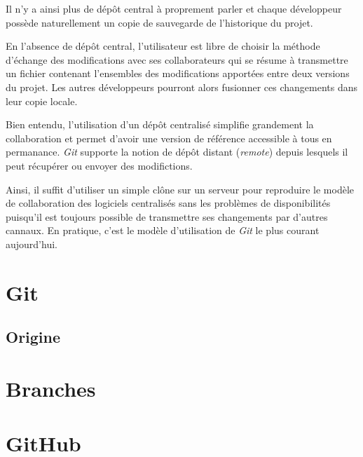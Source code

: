 \documentclass[11pt,a4paper]{article}
\begin{document}
Il n'y a ainsi plus de dépôt central à proprement parler et chaque développeur possède naturellement un copie de sauvegarde de l'historique du projet.

En l'absence de dépôt central, l'utilisateur est libre de choisir la méthode d'échange des modifications avec ses collaborateurs qui se résume à transmettre un fichier contenant l'ensembles des modifications apportées entre deux versions du projet. Les autres développeurs pourront alors fusionner ces changements dans leur copie locale.

Bien entendu, l'utilisation d'un dépôt centralisé simplifie grandement la collaboration et permet d'avoir une version de référence accessible à tous en permanance. \textit{Git} supporte la notion de dépôt distant (\textit{remote}) depuis lesquels il peut récupérer ou envoyer des modifictions.

Ainsi, il suffit d'utiliser un simple clône sur un serveur pour reproduire le modèle de collaboration des logiciels centralisés sans les problèmes de disponibilités puisqu'il est toujours possible de transmettre ses changements par d'autres cannaux. En pratique, c'est le modèle d'utilisation de \textit{Git} le plus courant aujourd'hui.

\section{Git}

\subsection{Origine}

\section{Branches}

\section{GitHub}
\end{document}
